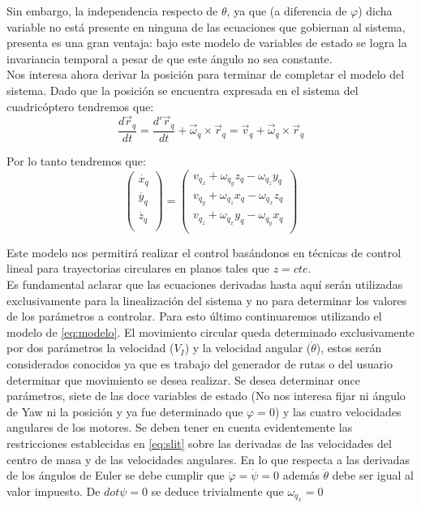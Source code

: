 \documentclass[main]{subfiles}
\begin{document}
Sin embargo, la independencia respecto de $\theta$, ya que (a diferencia de $\varphi$) dicha variable no est\'a presente en ninguna de las ecuaciones que gobiernan al sistema, presenta es una gran ventaja: bajo este modelo de variables de estado se logra la invariancia temporal a pesar de que este \'angulo no sea constante. \\

Nos interesa ahora derivar la posici\'on para terminar de completar el modelo del sistema. Dado que la posici\'on se encuentra expresada en el sistema del cuadric\'optero tendremos que:
\begin{equation}
\frac{d\vec{r}_q}{dt}=\frac{d\prime\vec{r}_q}{dt}+\vec{\omega}_q \times \vec{r}_q=\vec{v}_q+\vec{\omega}_q \times \vec{r}_q
\end{equation}

Por lo tanto tendremos que:
\begin{equation}
\label{eq:MVEcirc}
\left(\begin{array}{c}
\dot{x_q}\\
\dot{y_q}\\
\dot{z_q}\\
\end{array}\right)=\left(\begin{array}{c}
v_{q_x}+\omega_{q_y}z_q-\omega_{q_z}y_q\\
v_{q_y}+\omega_{q_z}x_q-\omega_{q_x}z_q\\
v_{q_z}+\omega_{q_x}y_q-\omega_{q_y}x_q\\
\end{array}\right)
\end{equation}

Este modelo nos permitir\'a realizar el control bas\'andonos en t\'ecnicas de control lineal para trayectorias circulares en planos tales que $z=cte$.\\

Es fundamental aclarar que las ecuaciones derivadas hasta aqu\'i ser\'an utilizadas exclusivamente para la linealizaci\'on del sistema y no para determinar los valores de los par\'ametros a controlar. Para esto \'ultimo continuaremos utilizando el modelo de \ref{eq:modelo}. El movimiento circular queda determinado exclusivamente por dos par\'ametros la velocidad ($V_I$) y la velocidad angular ($\dot{\theta}$), estos ser\'an considerados conocidos ya que es trabajo del generador de rutas o del usuario determinar que movimiento se desea realizar. Se desea determinar once par\'ametros, siete de las doce variables de estado (No nos interesa fijar ni \'angulo de Yaw ni la posici\'on y ya fue determinado que $\varphi = 0$) y las cuatro velocidades angulares de los motores.  Se deben tener en cuenta evidentemente las restricciones establecidas en \ref{eq:slit} sobre las derivadas de las velocidades del centro de masa y de las velocidades angulares. En lo que respecta a las derivadas de los \'angulos de Euler se debe cumplir que $\dot{\varphi}=\dot{\psi}=0$ adem\'as $\dot{\theta}$ debe ser igual al valor impuesto. De $dot{\psi} = 0$ se deduce trivialmente que $\omega_{q_x} = 0$ 
\end{document}
